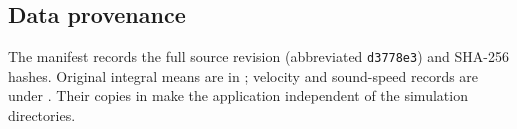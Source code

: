 \subsection{Data provenance}
\label{sec:app_data_record}

The manifest  records the full source revision (abbreviated \texttt{d3778e3}) and SHA-256 hashes. Original integral means are in ; velocity and sound-speed records are under . Their copies in  make the application independent of the simulation directories.



